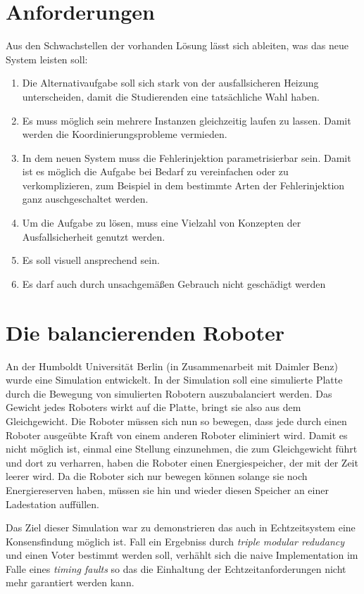 \clearpage
\section{Anforderungen}\label{anforderung}
Aus den Schwachstellen der vorhanden L{\"{o}}sung l{\"{a}}sst sich ableiten, was das neue System leisten soll:
\begin{enumerate}
	\item Die Alternativaufgabe soll sich stark von der ausfallsicheren Heizung unterscheiden, damit die Studierenden eine tats{\"{a}}chliche Wahl haben.
	\item Es muss m{\"{o}}glich sein mehrere Instanzen gleichzeitig laufen zu lassen. Damit werden die Koordinierungsprobleme vermieden.
	\item In dem neuen System muss die Fehlerinjektion parametrisierbar sein. Damit ist es m{\"{o}}glich
		die Aufgabe bei Bedarf zu vereinfachen oder zu verkomplizieren, zum Beispiel in dem bestimmte
		Arten der Fehlerinjektion ganz auschgeschaltet werden.
	\item Um die Aufgabe zu l{\"{o}}sen, muss eine Vielzahl von Konzepten der Ausfallsicherheit genutzt werden.
	\item Es soll visuell ansprechend sein.
	\item Es darf auch durch unsachgem{\"{a}}{\ss}en Gebrauch nicht gesch{\"{a}}digt werden
\end{enumerate}

\clearpage
\section{Die balancierenden Roboter}
An der Humboldt Universit{\"{a}}t Berlin (in Zusammenarbeit mit Daimler Benz) wurde eine Simulation\cite{Werner00} entwickelt. In der Simulation soll
eine simulierte Platte durch die Bewegung von simulierten Robotern auszubalanciert werden. Das Gewicht jedes Roboters wirkt auf die Platte, bringt sie also aus dem Gleichgewicht.
Die Roboter m{\"{u}}ssen sich nun so
bewegen, dass jede durch einen Roboter ausge{\"{u}}bte Kraft von einem anderen Roboter eliminiert wird. Damit es nicht m{\"{o}}glich ist, einmal eine Stellung einzunehmen,
die zum Gleichgewicht f{\"{u}}hrt und dort zu verharren, haben die Roboter einen Energiespeicher, der mit der Zeit leerer wird. Da die Roboter sich nur bewegen k{\"{o}}nnen
solange sie noch Energiereserven haben, m{\"{u}}ssen sie hin und wieder diesen Speicher an einer Ladestation auff{\"{u}}llen.

Das Ziel dieser Simulation war zu demonstrieren das auch in Echtzeitsystem eine Konsensfindung m{\"{o}}glich ist. Fall ein Ergebniss durch
\textit{triple modular redudancy} und einen Voter bestimmt werden soll, verh{\"{a}}hlt sich die naive Implementation im Falle eines \textit{timing faults} so das die
Einhaltung der Echtzeitanforderungen nicht mehr garantiert werden kann. 

